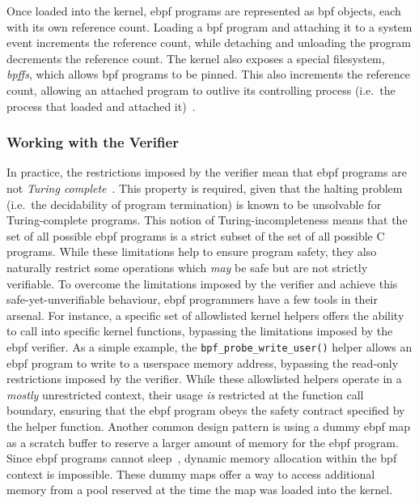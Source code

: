\documentclass[
  fontsize=12pt,
  titlepage=firstiscover,
  paper=letter,
oneside,
  cleardoublepage=plain,
  parskip=half-,
  DIV=10,
  parindent,
  appendixprefix,
  chapterprefix,
  listof=totoc,
]{scrbook}
\begin{document}
Once loaded into the kernel, \gls{ebpf} programs are represented as \gls{bpf} objects, each with its
own reference count. Loading a \gls{bpf} program and attaching it to a system event increments
the reference count, while detaching and unloading the program decrements the reference
count. The kernel also exposes a special filesystem, \textit{bpffs}, which allows \gls{bpf}
programs to be pinned. This also increments the reference count, allowing an attached
program to outlive its controlling process (i.e.\ the process that loaded and attached
it)~\cite{gregg2019_bpf}.

\subsubsection*{Working with the Verifier}

In practice, the restrictions imposed by the verifier mean that \gls{ebpf} programs are not
\textit{Turing complete}~\cite{gregg2019_bpf}.  This property is required, given that the
halting problem (i.e.\ the decidability of program termination) is known to be unsolvable
for Turing-complete programs. This notion of Turing-incompleteness means that the set of
all possible \gls{ebpf} programs is a strict subset of the set of all possible C programs. While
these limitations help to ensure program safety, they also naturally restrict some
operations which \textit{may} be safe but are not strictly verifiable. To overcome the
limitations imposed by the verifier and achieve this safe-yet-unverifiable behaviour, \gls{ebpf}
programmers have a few tools in their arsenal. For instance, a specific set of allowlisted
kernel helpers offers the ability to call into specific kernel functions, bypassing the
limitations imposed by the \gls{ebpf} verifier. As a simple example, the
\texttt{bpf\_probe\_write\_user()} helper allows an \gls{ebpf} program to write to a userspace
memory address, bypassing the read-only restrictions imposed by the verifier. While these
allowlisted helpers operate in a \textit{mostly} unrestricted context, their usage
\textit{is} restricted at the function call boundary, ensuring that the \gls{ebpf} program obeys
the safety contract specified by the helper function.  Another common design pattern is
using a dummy \gls{ebpf} map as a scratch buffer to reserve a larger amount of memory for the
\gls{ebpf} program.  Since \gls{ebpf} programs cannot sleep~\cite{gregg2019_bpf}, dynamic memory
allocation within the \gls{bpf} context is impossible. These dummy maps offer a way to access
additional memory from a pool reserved at the time the map was loaded into the kernel.
\end{document}
